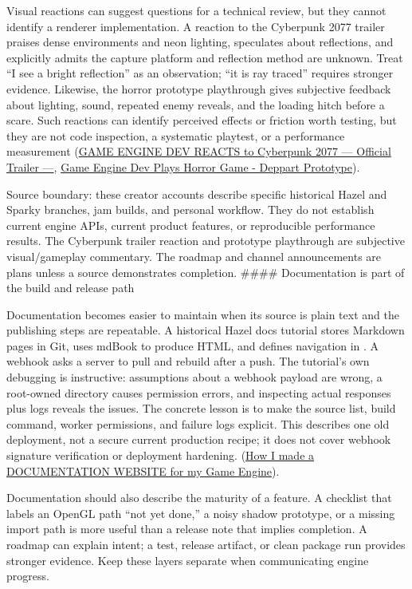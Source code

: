 Visual reactions can suggest questions for a technical review, but they cannot identify a renderer implementation. A reaction to the Cyberpunk 2077 trailer praises dense environments and neon lighting, speculates about reflections, and explicitly admits the capture platform and reflection method are unknown. Treat ``I see a bright reflection'' as an observation; ``it is ray traced'' requires stronger evidence. Likewise, the horror prototype playthrough gives subjective feedback about lighting, sound, repeated enemy reveals, and the loading hitch before a scare. Such reactions can identify perceived effects or friction worth testing, but they are not code inspection, a systematic playtest, or a performance measurement (\href{https://www.youtube.com/watch?v=ZyfFCIFHYuk&t=1m11s}{GAME ENGINE DEV REACTS to Cyberpunk 2077 --- Official Trailer ---}, \href{https://www.youtube.com/watch?v=Y3-p6MlTjLA&t=0m0s}{Game Engine Dev Plays Horror Game - Deppart Prototype}).

Source boundary: these creator accounts describe specific historical Hazel and Sparky branches, jam builds, and personal workflow. They do not establish current engine APIs, current product features, or reproducible performance results. The Cyberpunk trailer reaction and prototype playthrough are subjective visual/gameplay commentary. The roadmap and channel announcements are plans unless a source demonstrates completion. \#\#\#\# Documentation is part of the build and release path

Documentation becomes easier to maintain when its source is plain text and the publishing steps are repeatable. A historical Hazel docs tutorial stores Markdown pages in Git, uses mdBook to produce HTML, and defines navigation in . A webhook asks a server to pull and rebuild after a push. The tutorial's own debugging is instructive: assumptions about a webhook payload are wrong, a root-owned directory causes permission errors, and inspecting actual responses plus logs reveals the issues. The concrete lesson is to make the source list, build command, worker permissions, and failure logs explicit. This describes one old deployment, not a secure current production recipe; it does not cover webhook signature verification or deployment hardening. (\href{https://www.youtube.com/watch?v=tJDof3nrfHU&t=3m18s}{How I made a DOCUMENTATION WEBSITE for my Game Engine}).

Documentation should also describe the maturity of a feature. A checklist that labels an OpenGL path ``not yet done,'' a noisy shadow prototype, or a missing import path is more useful than a release note that implies completion. A roadmap can explain intent; a test, release artifact, or clean package run provides stronger evidence. Keep these layers separate when communicating engine progress.

